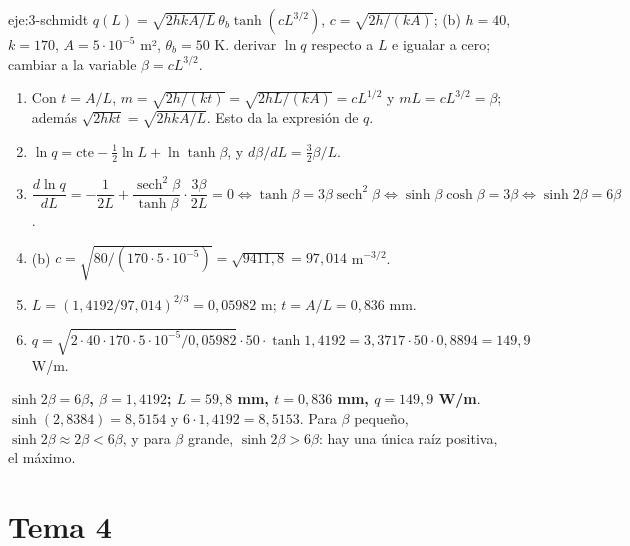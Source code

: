 \begin{solucion}{eje:3-schmidt}
\datos $q(L)=\sqrt{2hkA/L}\,\theta_b\tanh(cL^{3/2})$, $c=\sqrt{2h/(kA)}$; (b) $h=40$, $k=170$, $A=5\cdot 10^{-5}$ m², $\theta_b=50$ K.
\planteamiento derivar $\ln q$ respecto a $L$ e igualar a cero; cambiar a la variable $\beta=cL^{3/2}$.
\pasos
\begin{enumerate}[label=\arabic*.]
  \item Con $t=A/L$, $m=\sqrt{2h/(kt)}=\sqrt{2hL/(kA)}=cL^{1/2}$ y $mL=cL^{3/2}=\beta$; además $\sqrt{2hkt}=\sqrt{2hkA/L}$. Esto da la expresión de $q$.
  \item $\ln q=\text{cte}-\tfrac12\ln L+\ln\tanh\beta$, y $d\beta/dL=\tfrac32\beta/L$.
  \item $\dfrac{d\ln q}{dL}=-\dfrac{1}{2L}+\dfrac{\operatorname{sech}^2\beta}{\tanh\beta}\cdot\dfrac{3\beta}{2L}=0\iff\tanh\beta=3\beta\operatorname{sech}^2\beta\iff\sinh\beta\cosh\beta=3\beta\iff\sinh 2\beta=6\beta$.
  \item (b) $c=\sqrt{80/(170\cdot 5\cdot 10^{-5})}=\sqrt{9411{,}8}=97{,}014$ m$^{-3/2}$.
  \item $L=(1{,}4192/97{,}014)^{2/3}=0{,}05982$ m; $t=A/L=0{,}836$ mm.
  \item $q=\sqrt{2\cdot 40\cdot 170\cdot 5\cdot 10^{-5}/0{,}05982}\cdot 50\cdot\tanh 1{,}4192=3{,}3717\cdot 50\cdot 0{,}8894=149{,}9$ W/m.
\end{enumerate}
\resultado \textbf{$\sinh 2\beta=6\beta$, $\beta=1{,}4192$; $L=59{,}8$ mm, $t=0{,}836$ mm, $q=149{,}9$ W/m}.
\comprobacion $\sinh(2{,}8384)=8{,}5154$ y $6\cdot 1{,}4192=8{,}5153$. Para $\beta$ pequeño, $\sinh 2\beta\approx 2\beta<6\beta$, y para $\beta$ grande, $\sinh 2\beta>6\beta$: hay una única raíz positiva, el máximo.
\end{solucion}

\section{Tema 4}

